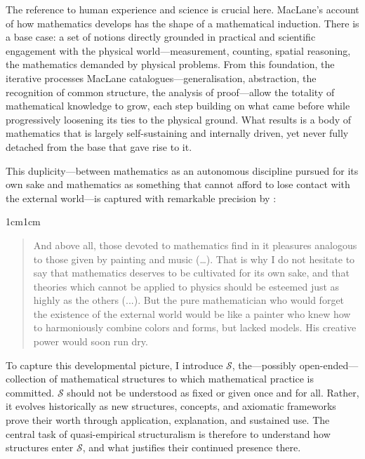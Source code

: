 \documentclass[11pt,a4paper]{article}
\begin{document}
The reference to human experience and science is crucial here. MacLane's account of how mathematics develops has the shape of a mathematical induction. There is a base case: a set of notions directly grounded in practical and scientific engagement with the physical world---measurement, counting, spatial reasoning, the mathematics demanded by physical problems. From this foundation, the iterative processes MacLane catalogues---generalisation, abstraction, the recognition of common structure, the analysis of proof---allow the totality of mathematical knowledge to grow, each step building on what came before while progressively loosening its ties to the physical ground. What results is a body of mathematics that is largely self-sustaining and internally driven, yet never fully detached from the base that gave rise to it.

This duplicity---between mathematics as an autonomous discipline pursued for its own sake and mathematics as something that cannot afford to lose contact with the external world---is captured with remarkable precision by \textcite[pp. 332--337]{Poincare1897rapports}:

\begin{adjustwidth}{1cm}{1cm}
\small
\begin{quote}
And above all, those devoted to mathematics find in it pleasures analogous to those given by painting and music (\dots). That is why I do not hesitate to say that mathematics deserves to be cultivated for its own sake, and that theories which cannot be applied to physics should be esteemed just as highly as the others (...). But the pure mathematician who would forget the existence of the external world would be like a painter who knew how to harmoniously combine colors and forms, but lacked models. His creative power would soon run dry. 
\end{quote}
\end{adjustwidth}

To capture this developmental picture, I introduce $\mathcal{S}$, the—possibly open-ended—collection of mathematical structures to which mathematical practice is committed. $\mathcal{S}$ should not be understood as fixed or given once and for all. Rather, it evolves historically as new structures, concepts, and axiomatic frameworks prove their worth through application, explanation, and sustained use. The central task of quasi-empirical structuralism is therefore to understand how structures enter $\mathcal{S}$, and what justifies their continued presence there.
\end{document}
